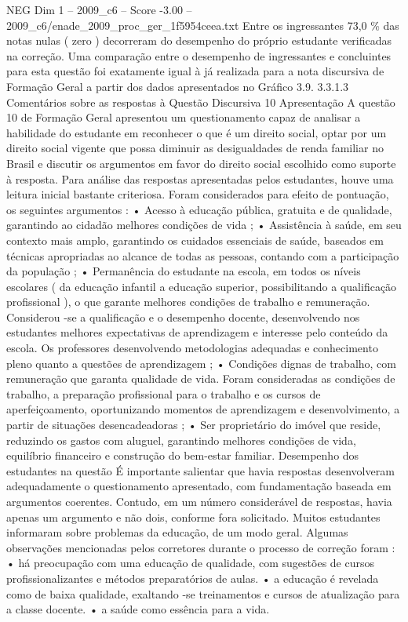 \begin{textsample}{NEG Dim 1 – 2009\_c6 – Score -3.00 – 2009\_c6/enade\_2009\_proc\_ger\_1f5954ceea.txt}
Entre os ingressantes 73,0 \% das notas nulas ( zero ) decorreram do desempenho do próprio estudante verificadas na correção.
Uma comparação entre o desempenho de ingressantes e concluintes para esta questão foi exatamente igual à já realizada para a nota discursiva de Formação Geral a partir dos dados apresentados no Gráfico 3.9. 3.3.1.3 Comentários sobre as respostas à Questão Discursiva 10 Apresentação A questão 10 de Formação Geral apresentou um questionamento capaz de analisar a habilidade do estudante em reconhecer o que é um direito social, optar por um direito social vigente que possa diminuir as desigualdades de renda familiar no Brasil e discutir os argumentos em favor do direito social escolhido como suporte à resposta.
Para análise das respostas apresentadas pelos estudantes, houve uma leitura inicial bastante criteriosa.
Foram considerados para efeito de pontuação, os seguintes argumentos : • Acesso à educação pública, gratuita e de qualidade, garantindo ao cidadão melhores condições de vida ; • Assistência à saúde, em seu contexto mais amplo, garantindo os cuidados essenciais de saúde, baseados em técnicas apropriadas ao alcance de todas as pessoas, contando com a participação da população ; • Permanência do estudante na escola, em todos os níveis escolares ( da educação infantil a educação superior, possibilitando a qualificação profissional ), o que garante melhores condições de trabalho e remuneração.
Considerou -se a qualificação e o desempenho docente, desenvolvendo nos estudantes melhores expectativas de aprendizagem e interesse pelo conteúdo da escola.
Os professores desenvolvendo metodologias adequadas e conhecimento pleno quanto a questões de aprendizagem ; • Condições dignas de trabalho, com remuneração que garanta qualidade de vida.
Foram consideradas as condições de trabalho, a preparação profissional para o trabalho e os cursos de aperfeiçoamento, oportunizando momentos de aprendizagem e desenvolvimento, a partir de situações desencadeadoras ; • Ser proprietário do imóvel que reside, reduzindo os gastos com aluguel, garantindo melhores condições de vida, equilíbrio financeiro e construção do bem-estar familiar.
Desempenho dos estudantes na questão É importante salientar que havia respostas desenvolveram adequadamente o questionamento apresentado, com fundamentação baseada em argumentos coerentes.
Contudo, em um número considerável de respostas, havia apenas um argumento e não dois, conforme fora solicitado.
Muitos estudantes informaram sobre problemas da educação, de um modo geral.
Algumas observações mencionadas pelos corretores durante o processo de correção foram : • há preocupação com uma educação de qualidade, com sugestões de cursos profissionalizantes e métodos preparatórios de aulas. • a educação é revelada como de baixa qualidade, exaltando -se treinamentos e cursos de atualização para a classe docente. • a saúde como essência para a vida.

\end{textsample}
